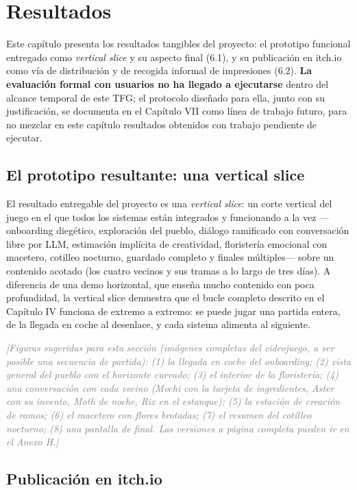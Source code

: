 \documentclass[12pt,twoside,titlepage]{report}
\begin{document}
\chapter{Resultados}

Este capítulo presenta los resultados tangibles del proyecto: el prototipo funcional entregado como \textit{vertical slice} y su aspecto final (6.1), y su publicación en itch.io como vía de distribución y de recogida informal de impresiones (6.2). \textbf{La evaluación formal con usuarios no ha llegado a ejecutarse} dentro del alcance temporal de este TFG; el protocolo diseñado para ella, junto con su justificación, se documenta en el Capítulo VII como línea de trabajo futuro, para no mezclar en este capítulo resultados obtenidos con trabajo pendiente de ejecutar.

\section{El prototipo resultante: una vertical slice}

El resultado entregable del proyecto es una \textit{vertical slice}: un corte vertical del juego en el que todos los sistemas están integrados y funcionando a la vez ---onboarding diegético, exploración del pueblo, diálogo ramificado con conversación libre por LLM, estimación implícita de creatividad, floristería emocional con macetero, cotilleo nocturno, guardado completo y finales múltiples--- sobre un contenido acotado (los cuatro vecinos y sus tramas a lo largo de tres días). A diferencia de una demo horizontal, que enseña mucho contenido con poca profundidad, la vertical slice demuestra que el bucle completo descrito en el Capítulo IV funciona de extremo a extremo: se puede jugar una partida entera, de la llegada en coche al desenlace, y cada sistema alimenta al siguiente.

\textcolor{gray}{\textit{[Figuras sugeridas para esta sección (imágenes completas del videojuego, a ser posible una secuencia de partida): (1) la llegada en coche del onboarding; (2) vista general del pueblo con el horizonte curvado; (3) el interior de la floristería; (4) una conversación con cada vecino (Mochi con la tarjeta de ingredientes, Aster con su invento, Moth de noche, Rix en el estanque); (5) la estación de creación de ramos; (6) el macetero con flores brotadas; (7) el resumen del cotilleo nocturno; (8) una pantalla de final. Las versiones a página completa pueden ir en el Anexo H.]}}

\section{Publicación en itch.io}
\end{document}
